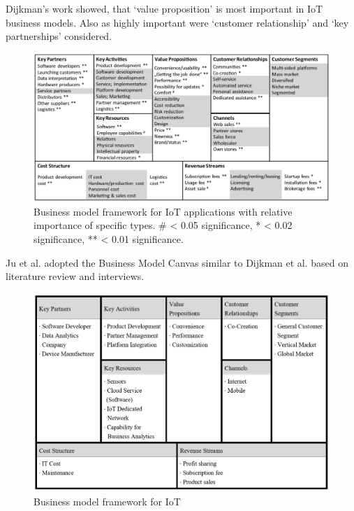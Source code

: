 Dijkman's work showed, that `value proposition' is most important in IoT business models. Also as highly important were `customer relationship' and `key  partnerships' considered. 

  \begin{figure}[h]
    \begin{center}
    \includegraphics[scale=0.52]{Talk11/iot_canvas_rel_imp_dijkman.jpg}
    \end{center}
    \caption{Business model framework for IoT applications with relative importance of specific types. \# < 0.05 significance, * < 0.02 significance, **  < 0.01 significance.}
    \label{Business model for IoT}
  \end{figure}

Ju et al. adopted the Business Model Canvas similar to Dijkman et al. based on literature review and interviews.


  \begin{figure}[h]
    \begin{center}
    \includegraphics[scale=0.7]{Talk11/iot_canvas_ju.jpg}
    \end{center}
    \caption{  Business model framework for IoT }
    \label{ Business model for IoT Ju}
  \end{figure}


